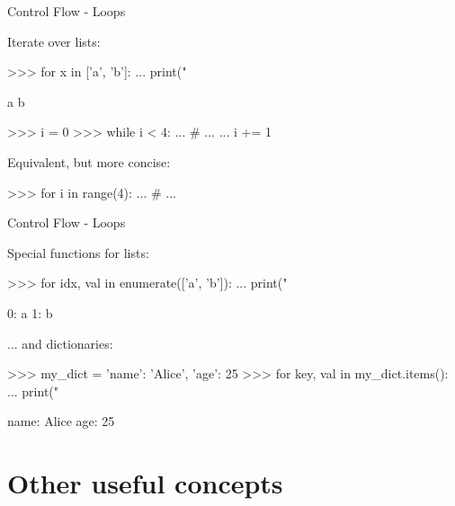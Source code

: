 \documentclass[10pt]{beamer}
\begin{document}

\begin{frame}[fragile]{Control Flow - Loops}

Iterate over lists:

\begin{pythoncode}
>>> for x in ['a', 'b']:
...     print("%

a
b
\end{pythoncode}



\begin{pythoncode}
>>> i = 0
>>> while i < 4:
...     # ...
...     i += 1
\end{pythoncode}

Equivalent, but more concise:

\begin{pythoncode}
>>> for i in range(4):
...     # ...
\end{pythoncode}

\end{frame}


\begin{frame}[fragile]{Control Flow - Loops}

Special functions for lists:

\begin{pythoncode}
>>> for idx, val in enumerate(['a', 'b']):
...     print("%

0: a
1: b
\end{pythoncode}



... and dictionaries:

\begin{pythoncode}
>>> my_dict = {'name': 'Alice', 'age': 25}
>>> for key, val in my_dict.items():
...     print("%

name: Alice
age: 25
\end{pythoncode}
\end{frame}


\section{Other useful concepts}
\end{document}
